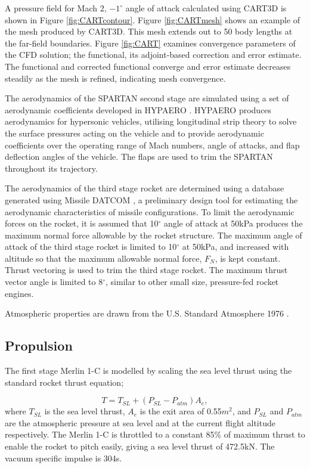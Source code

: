 \documentclass[]{aiaa-tc}
\begin{document}
A pressure field for Mach 2, $-1^\circ$ angle of attack calculated using CART3D is shown in Figure \ref{fig:CARTcontour}. Figure \ref{fig:CARTmesh} shows an example of the mesh produced by CART3D. This mesh extends out to 50 body lengths at the far-field boundaries. Figure \ref{fig:CART} examines convergence parameters of the CFD solution; the functional, its adjoint-based correction and error estimate. The functional and corrected functional converge and error estimate decreases steadily as the mesh is refined, indicating mesh convergence.

The aerodynamics of the SPARTAN second stage are simulated using a set of aerodynamic coefficients developed in HYPAERO \cite{Jazra2009,Preller2017}. HYPAERO produces aerodynamics for hypersonic vehicles, utilising longitudinal strip theory to solve the surface pressures acting on the vehicle and to provide aerodynamic coefficients over the operating range of Mach numbers, angle of attacks, and flap deflection angles of the vehicle. The flaps are used to trim the SPARTAN throughout its trajectory. 

The aerodynamics of the third stage rocket are determined using a database generated using Missile DATCOM \cite{Blake1998}, a preliminary design tool for estimating the aerodynamic characteristics of missile configurations. 
To limit the aerodynamic forces on the rocket, it is assumed that 10$^\circ$ angle of attack at 50kPa produces the maximum normal force allowable by the rocket structure. The maximum angle of attack of the third stage rocket is limited to 10$^\circ$ at 50kPa, and increased with altitude so that the maximum allowable normal force, $F_N$, is kept constant. Thrust vectoring is used to trim the third stage rocket. The maximum thrust vector angle is limited to 8$^\circ$, similar to other small size, pressure-fed rocket engines\cite{Zandbergen}. 

Atmospheric properties are drawn from the U.S. Standard Atmosphere 1976 \cite{Administration1976}.  
\subsection{Propulsion}
The first stage Merlin 1-C is modelled by scaling the sea level thrust using the standard rocket thrust equation;

\begin{equation}
T = T_{SL} + (P_{SL}-P_{atm}) A_e,
\end{equation}
where $T_{SL}$ is the sea level thrust, $A_e$ is the exit area of 0.55$m^2$, and $P_{SL}$ and $P_{atm}$ are the atmospheric pressure at sea level and at the current flight altitude respectively. The Merlin 1-C is throttled to a constant 85\% of maximum thrust to enable the rocket to pitch easily, giving a sea level thrust of 472.5kN\cite{Vehicle2008}. The vacuum specific impulse is 304s\cite{Vehicle2008}.
\end{document}
